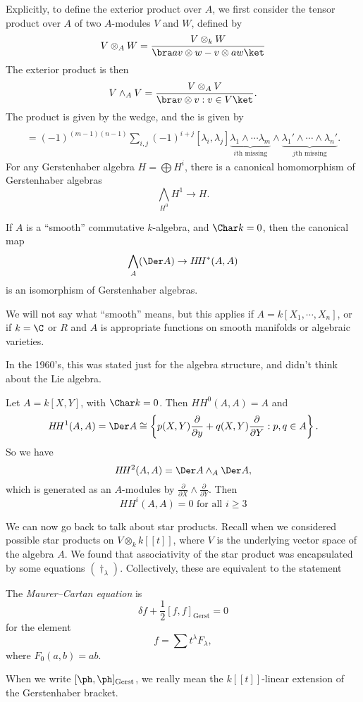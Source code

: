 \documentclass[a4paper]{article}
\newcommand\HH{H\!H}
\begin{document}
Explicitly, to define the exterior product over $A$, we first consider the tensor product over $A$ of two $A$-modules $V$ and $W$, defined by
\[
  V \otimes_A W = \frac{V \otimes_k W}{\bra av \otimes w - v \otimes aw\ket}
\]
The exterior product is then
\[
  V \wedge_A V = \frac{V \otimes_A V}{\bra v \otimes v: v \in V\ket}.
\]
The product is given by the wedge, and the  is given by
\begin{multline*}
  [\lambda_1 \wedge \cdots \wedge \lambda_m, \lambda_1' \wedge \cdots \wedge \lambda_n'] \\
  = (-1)^{(m - 1)(n - 1)} \sum_{i, j} (-1)^{i + j} [\lambda_i, \lambda_j] \underbrace{\lambda_1 \wedge \cdots \lambda_m}_{\text{$i$th missing}} \wedge \underbrace{\lambda_1' \wedge \cdots \wedge \lambda_n'}_{\text{$j$th missing}}.
\end{multline*}
For any Gerstenhaber algebra $H = \bigoplus H^i$, there is a canonical homomorphism of Gerstenhaber algebras
\[
  \bigwedge_{H^0}H^1 \to H.
\]
\begin{thm}
  If $A$ is a ``smooth'' commutative $k$-algebra, and $\Char k = 0$, then the canonical map
  \[
    \bigwedge_A (\Der A) \to \HH^*(A, A)
  \]
  is an isomorphism of Gerstenhaber algebras.
\end{thm}
We will not say what ``smooth'' means, but this applies if $A = k[X_1, \cdots, X_n]$, or if $k = \C$ or $R$ and $A$ is appropriate functions on smooth manifolds or algebraic varieties.

In the 1960's, this was stated just for the algebra structure, and didn't think about the Lie algebra.

\begin{eg}
  Let $A = k[X, Y]$, with $\Char k = 0$. Then $\HH^0(A, A) = A$ and
  \[
    \HH^1(A, A) = \Der A \cong \left\{p(X, Y) \frac{\partial}{\partial y} + q(X, Y) \frac{\partial}{\partial Y}: p, q \in A\right\}.
  \]
  So we have
  \[
    \HH^2(A, A) = \Der A \wedge_A \Der A,
  \]
  which is generated as an $A$-modules by $\frac{\partial}{\partial X} \wedge \frac{\partial}{\partial Y}$. Then
  \[
    \HH^i(A, A) = 0\text{ for all }i \geq 3
  \]
\end{eg}

We can now go back to talk about star products. Recall when we considered possible star products on $V \otimes_k k[[t]]$, where $V$ is the underlying vector space of the algebra $A$. We found that associativity of the star product was encapsulated by some equations $(\dagger_\lambda)$. Collectively, these are equivalent to the statement
\begin{defi}
  The \emph{Maurer--Cartan equation} is
  \[
    \delta f + \frac{1}{2} [f, f]_{\mathrm{Gerst}} = 0
  \]
  for the element
  \[
    f = \sum t^\lambda F_\lambda,
  \]
  where $F_0(a, b) = ab$.
\end{defi}
When we write $[\ph, \ph]_{\mathrm{Gerst}}$, we really mean the $k[[t]]$-linear extension of the Gerstenhaber bracket.
\end{document}
